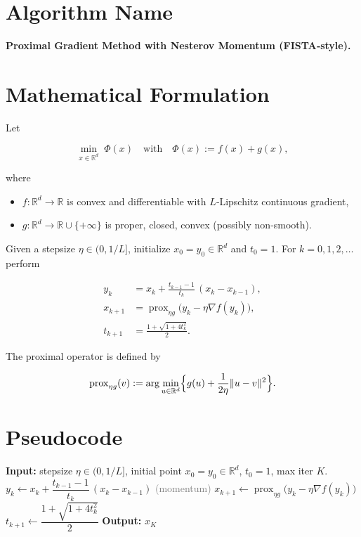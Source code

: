 \documentclass{article}
\newcommand{\prox}{\operatorname{prox}}
\newcommand{\R}{\mathbb{R}}
\begin{document}
\section*{Algorithm Name}
\textbf{Proximal Gradient Method with Nesterov Momentum (FISTA‐style).}

\section*{Mathematical Formulation}
Let  

\[
\min_{x\in\R^{d}} \; \Phi(x)\quad\text{with}\quad \Phi(x):=f(x)+g(x),
\]

where  

\begin{itemize}[nosep]
\item $f:\R^{d}\!\to\!\R$ is convex and differentiable with $L$‑Lipschitz continuous gradient,
\item $g:\R^{d}\!\to\!\R\cup\{+\infty\}$ is proper, closed, convex (possibly non‑smooth).
\end{itemize}

Given a stepsize $\eta\in(0,1/L]$, initialize $x_{0}=y_{0}\in\R^{d}$ and $t_{0}=1$.  
For $k=0,1,2,\dots$ perform  

\[
\boxed{
\begin{aligned}
y_{k} &= x_{k}+ \frac{t_{k-1}-1}{t_{k}}\,(x_{k}-x_{k-1}), \tag{1}\\[4pt]
x_{k+1} &= \prox_{\eta g}\!\bigl(y_{k}-\eta\nabla f(y_{k})\bigr), \tag{2}\\[4pt]
t_{k+1} &= \frac{1+\sqrt{1+4t_{k}^{2}}}{2}. \tag{3}
\end{aligned}}
\]

The proximal operator is defined by  

\[
\prox_{\eta g}(v):=\arg\min_{u\in\R^{d}}\Bigl\{ g(u)+\frac{1}{2\eta}\|u-v\|^{2}\Bigr\}.
\]

\section*{Pseudocode}
\begin{algorithm}[H]
\caption{Proximal Gradient with Momentum}
\begin{algorithmic}[1]
\STATE \textbf{Input:} stepsize $\eta\in(0,1/L]$, initial point $x_{0}=y_{0}\in\R^{d}$, $t_{0}=1$, max iter $K$.
    \STATE $y_{k}\gets x_{k}+ \dfrac{t_{k-1}-1}{t_{k}}\,(x_{k}-x_{k-1})$ \hfill\textcolor{gray}{(momentum)}
    \STATE $x_{k+1}\gets \prox_{\eta g}\!\bigl(y_{k}-\eta\nabla f(y_{k})\bigr)$
    \STATE $t_{k+1}\gets \dfrac{1+\sqrt{1+4t_{k}^{2}}}{2}$
\ENDFOR
\STATE \textbf{Output:} $x_{K}$
\end{algorithmic}
\end{algorithm}
\end{document}
